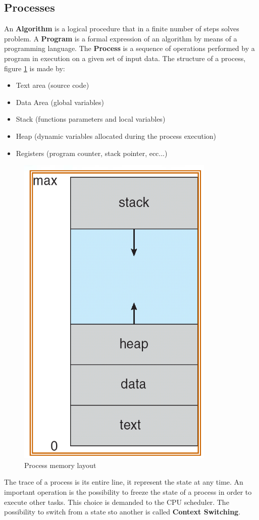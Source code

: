 \documentclass[12pt]{article}
\begin{document}
\subsection{Processes}
An \textbf{Algorithm} is a logical procedure that in a finite number of steps solves problem. A \textbf{Program} is a formal expression of an algorithm by means of a programming language. The \textbf{Process} is a sequence of operations performed by a program in execution on a given set of input data. The structure of a process, figure \ref{fig:proc_mem} is made by:
\begin{itemize}
  \item Text area (source code)
  \item Data Area (global variables)
  \item Stack (functions parameters and local variables)
  \item Heap (dynamic variables allocated during the process execution)
  \item Registers (program counter, stack pointer, ecc...)
\end{itemize}
\begin{figure}[H]
  \centering
  \includegraphics[width=0.5\linewidth]{images/proc_mem.png}
  \caption{Process memory layout}
  \label{fig:proc_mem}
\end{figure}
The trace of a process is its entire line, it represent the state at any time. An important operation is the possibility to freeze the state of a process in order to execute other tasks. This choice is demanded to the CPU scheduler. The possibility to switch from a state sto another is called \textbf{Context Switching}.\\
\end{document}

